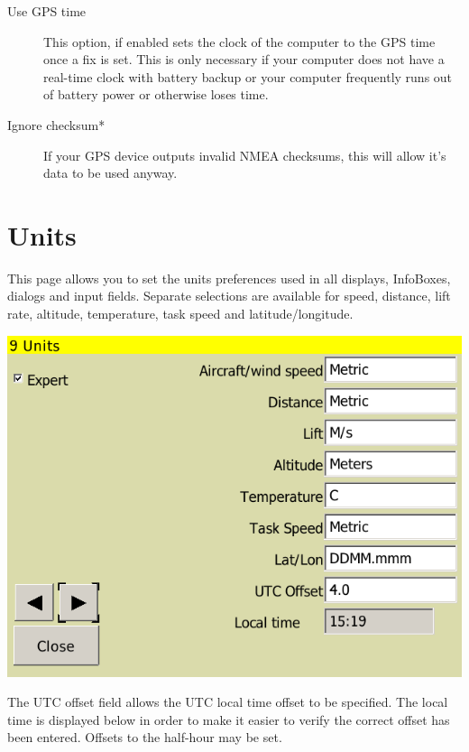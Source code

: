 \documentclass[a4paper,12pt]{refrep}
\newcommand{\InfoBox}[0]{{InfoBox}}
\begin{document}
\begin{description}
\item[Use GPS time] This option, if enabled sets the clock of the computer to the GPS time once a fix is set.  This is only necessary if your computer does not have a real-time clock with battery backup or your computer frequently runs out of battery power or otherwise loses time.
\item[Ignore checksum*] If your GPS device outputs invalid NMEA checksums, this will allow it's data to be used anyway.
\end{description}

\clearpage
\section{Units}

This page allows you to set the units preferences used in all
displays, {\InfoBox}es, dialogs and input fields.  Separate selections
are available for speed, distance, lift rate, altitude, temperature, task
speed and latitude/longitude.

\begin{center}
\includegraphics[angle=0,width=\linewidth,keepaspectratio='true']{figures/config-7.png}
\end{center}

The UTC offset field allows the UTC local time offset to be specified.
The local time is displayed below in order to make it easier to verify
the correct offset has been entered.  Offsets to the half-hour may be
set.

\end{document}
